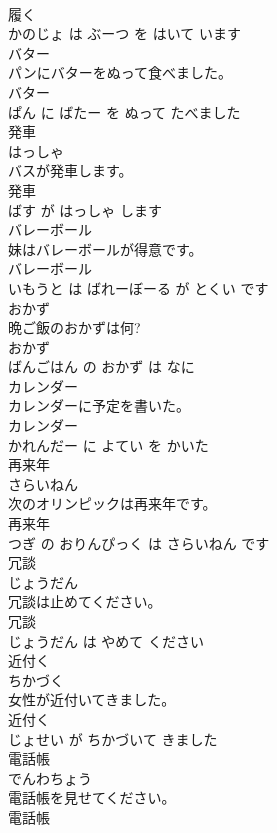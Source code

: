 \documentclass[8pt]{extreport}
\begin{document}
\begin{CJK}{UTF8}{min}
\\	履く 
\\	かのじょ は ぶーつ を はいて います			
\\	バター	
\\	パンにバターをぬって食べました。	
\\	バター 
\\	ぱん に ばたー を ぬって たべました			
\\	発車	
\\	はっしゃ			
\\	バスが発車します。	
\\	発車 
\\	ばす が はっしゃ します			
\\	バレーボール	
\\	妹はバレーボールが得意です。	
\\	バレーボール 
\\	いもうと は ばれーぼーる が とくい です			
\\	おかず	
\\	晩ご飯のおかずは何?	
\\	おかず 
\\	ばんごはん の おかず は なに			
\\	カレンダー	
\\	カレンダーに予定を書いた。	
\\	カレンダー 
\\	かれんだー に よてい を かいた			
\\	再来年	
\\	さらいねん			
\\	次のオリンピックは再来年です。	
\\	再来年 
\\	つぎ の おりんぴっく は さらいねん です			
\\	冗談	
\\	じょうだん			
\\	冗談は止めてください。	
\\	冗談 
\\	じょうだん は やめて ください			
\\	近付く	
\\	ちかづく			
\\	女性が近付いてきました。	
\\	近付く 
\\	じょせい が ちかづいて きました			
\\	電話帳	
\\	でんわちょう			
\\	電話帳を見せてください。	
\\	電話帳 

\end{CJK}
\end{document}
